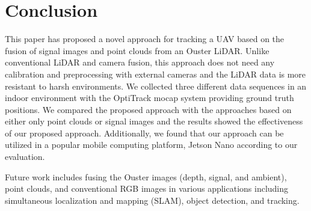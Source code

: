 
\section{Conclusion}\label{sec:conclusion}
This paper has proposed a novel approach for tracking a UAV based on the fusion of signal images and point clouds from an Ouster LiDAR. Unlike conventional LiDAR and camera fusion, this approach does not need any calibration and preprocessing with external cameras and the LiDAR data is more resistant to harsh environments. We collected three different data sequences in an indoor environment with the OptiTrack mocap system providing ground truth positions. We compared the proposed approach with the approaches based on either only point clouds or signal images and the results showed the effectiveness of our proposed approach. Additionally, we found that our approach can be utilized in a popular mobile computing platform, Jetson Nano according to our evaluation.

Future work includes fusing the Ouster images (depth, signal, and ambient), point clouds, and conventional RGB images in various applications including simultaneous localization
and mapping (SLAM), object detection, and tracking.
